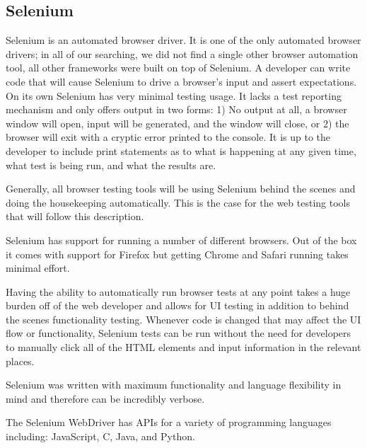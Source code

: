 \documentclass[12pt]{ucthesis}
\begin{document}
\subsection{Selenium}
Selenium\cite{Selenium} is an automated browser driver. It is one of the only automated browser drivers; in all of our searching, we did not find a single other browser automation tool, all other frameworks were built on top of Selenium. A developer can write code that will cause Selenium to drive a browser's input and assert expectations. On its own Selenium has very minimal testing usage. It lacks a test reporting mechanism and only offers output in two forms: 1) No output at all, a browser window will open, input will be generated, and the window will close, or 2) the browser will exit with a cryptic error printed to the console. It is up to the developer to include print statements as to what is happening at any given time, what test is being run, and what the results are.

Generally, all browser testing tools will be using Selenium behind the scenes and doing the housekeeping automatically. This is the case for the web testing tools that will follow this description.

Selenium has support for running a number of different browsers. Out of the box it comes with support for Firefox but getting Chrome and Safari running takes minimal effort.

Having the ability to automatically run browser tests at any point takes a huge burden off of the web developer and allows for UI testing in addition to behind the scenes functionality testing. Whenever code is changed that may affect the UI flow or functionality, Selenium tests can be run without the need for developers to manually click all of the HTML elements and input information in the relevant places.


Selenium was written with maximum functionality and language flexibility in mind and therefore can be incredibly verbose.

The Selenium WebDriver has APIs for a variety of programming languages including: JavaScript, C, Java, and Python.
\end{document}
